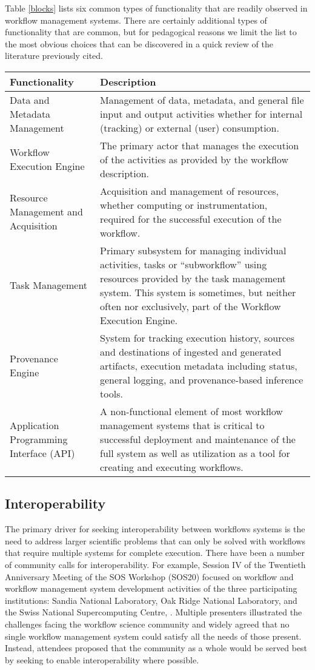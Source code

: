 Table \ref{blocks} lists six common types of functionality that are readily
observed in workflow management systems. There are certainly additional types of
functionality that are common, but for pedagogical reasons we limit the list to
the most obvious choices that can be discovered in a quick review of the
literature previously cited.

\begin{table*}[h] \begin{tabularx}{\textwidth}{|X|X|} \hline
\textbf{Functionality} & \textbf{Description} \tabularnewline\hline Data and
Metadata Management & Management of data, metadata, and general file input and
output activities whether for internal (tracking) or external (user)
consumption.  \tabularnewline\hline Workflow Execution Engine & The primary
actor that manages the execution of the activities as provided by the workflow
description. \tabularnewline\hline Resource Management and Acquisition &
Acquisition and management of resources, whether computing or instrumentation,
required for the successful execution of the workflow. \tabularnewline\hline
Task Management & Primary subsystem for managing individual activities, tasks or
``subworkflow'' using resources provided by the task management system. This
system is sometimes, but neither often nor exclusively, part of the Workflow
Execution Engine. \tabularnewline\hline Provenance Engine & System for tracking
execution history, sources and destinations of ingested and generated artifacts,
execution metadata including status, general logging, and provenance-based
inference tools. \tabularnewline\hline Application Programming Interface (API) &
A non-functional element of most workflow management systems that is critical to
successful deployment and maintenance of the full system as well as utilization
as a tool for creating and executing workflows. \tabularnewline\hline
\end{tabularx} \caption{Functionality commonly identified in workflow management
systems.} \label{blocks} \end{table*}

\subsection{Interoperability}

The primary driver for seeking interoperability between workflows systems is the
need to address larger scientific problems that can only be solved with
workflows that require multiple systems for complete execution. There have been
a number of community calls for interoperability. For example, Session IV of the
Twentieth Anniversary Meeting of the SOS Workshop (SOS20) focused on workflow
and workflow management system development activities of the three participating
institutions: Sandia National Laboratory, Oak Ridge National Laboratory, and the
Swiss National Supercomputing Centre, \cite{pack_sos20_2016}. Multiple
presenters illustrated the challenges facing the workflow science community and
widely agreed that no single workflow management system could satisfy all the
needs of those present. Instead, attendees proposed that the community as a
whole would be served best by seeking to enable interoperability where possible. 

